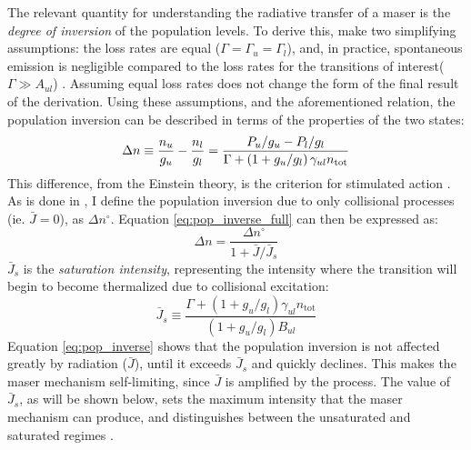 The relevant quantity for understanding the radiative transfer of a maser is the {\it degree of inversion} of the population levels. To derive this, \citet{stahler_palla_2004} make two simplifying assumptions: the loss rates are equal ($\Gamma=\Gamma_u=\Gamma_l$), and, in practice, spontaneous emission is negligible compared to the loss rates for the transitions of interest($\Gamma \gg A_{ul}$) \citep{Elitzur_1992}. Assuming equal loss rates does not change the form of the final result of the derivation. Using these assumptions, and the aforementioned relation, the population inversion can be described in terms of the properties of the two states:
\begin{equation}
\label{eq:pop_inverse_full}
\Delta n \equiv \frac{n_u}{g_u} - \frac{n_l}{g_l} \\
    = \frac{P_u/g_u - P_l/g_l}{\Gamma + \left( 1 + g_u/g_l \right)\gamma_{ul} n_{\mathrm{tot}}}
\end{equation}
This difference, from the Einstein theory, is the criterion for stimulated action \citep{Gray_2009}. As is done in \citet{stahler_palla_2004}, I define the population inversion due to only collisional processes (ie. $\bar{J}=0$), as $\Delta n^{\circ}$. Equation \ref{eq:pop_inverse_full} can then be expressed as:
\begin{equation}
\label{eq:pop_inverse}
\Delta n = \frac{\Delta n^{\circ}}{1 + \bar{J}/\bar{J}_s}
\end{equation}
$\bar{J}_s$ is the {\it saturation intensity}, representing the intensity where the transition will begin to become thermalized due to collisional excitation:
\begin{equation}
\label{eq:sat_intensity}
\bar{J}_s \equiv \frac{\Gamma + \left( 1 + g_u/g_l \right)\gamma_{ul}n_{\mathrm{tot}}}{\left( 1 + g_u/g_l \right)B_{ul}}
\end{equation}
Equation \ref{eq:pop_inverse} shows that the population inversion is not affected greatly by radiation ($\bar{J}$), until it exceeds $\bar{J}_s$ and quickly declines. This makes the maser mechanism self-limiting, since $\bar{J}$ is amplified by the process. The value of $\bar{J}_s$, as will be shown below, sets the maximum intensity that the maser mechanism can produce, and distinguishes between the unsaturated and saturated regimes \citep{Elitzur_1992}.

